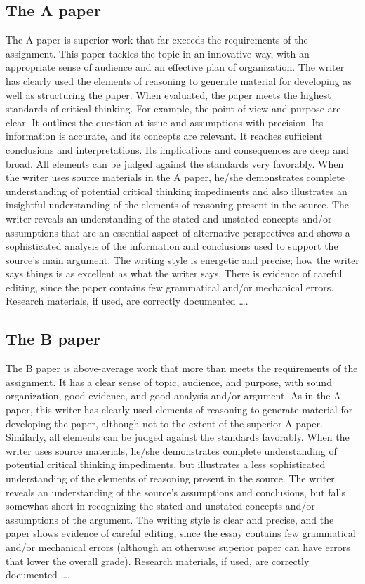 \documentclass[12pt, hidelinks]{article} %
\begin{document}
\subsection{The A paper}
The A paper is superior work that far exceeds the requirements of the assignment. This paper tackles the topic in an innovative way, with an appropriate sense of audience and an effective plan of organization. The writer has clearly used the elements of reasoning to generate material for developing as well as structuring the paper. When evaluated, the paper meets the highest standards of critical thinking. For example, the point of view and purpose are clear. It outlines the question at issue and assumptions with precision. Its information is accurate, and its concepts are relevant. It reaches sufficient conclusions and interpretations. Its implications and consequences are deep and broad. All elements can be judged against the standards very favorably. When the writer uses source materials in the A paper, he/she demonstrates complete understanding of potential critical thinking impediments and also illustrates an insightful understanding of the elements of reasoning present in the source. The writer reveals an understanding of the stated and unstated concepts and/or assumptions that are an essential aspect of alternative perspectives and shows a sophisticated analysis of the information and conclusions used to support the source’s main argument. The writing style is energetic and precise; how the writer says things is as excellent as what the writer says. There is evidence of careful editing, since the paper contains few grammatical and/or mechanical errors. Research materials, if used, are correctly documented \dots.

\subsection{The B paper}

The B paper is above-average work that more than meets the requirements of the assignment. It has a clear sense of topic, audience, and purpose, with sound organization, good evidence, and good analysis and/or argument. As in the A paper, this writer has clearly used elements of reasoning to generate material for developing the paper, although not to the extent of the superior A paper. Similarly, all elements can be judged against the standards favorably. When the writer uses source materials, he/she demonstrates complete understanding of potential critical thinking impediments, but illustrates a less sophisticated understanding of the elements of reasoning present in the source. The writer reveals an understanding of the source’s assumptions and conclusions, but falls somewhat short in recognizing the stated and unstated concepts and/or assumptions of the argument. The writing style is clear and precise, and the paper shows evidence of careful editing, since the essay contains few grammatical and/or mechanical errors (although an otherwise superior paper can have errors that lower the overall grade). Research materials, if used, are correctly documented \dots.
\end{document}
